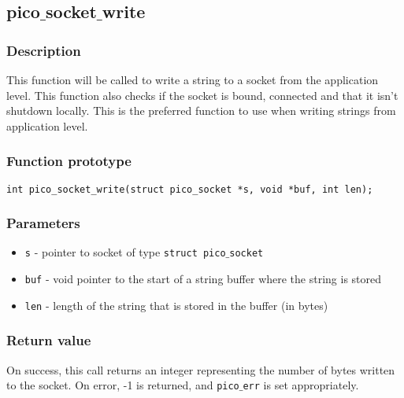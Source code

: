 \subsection{pico$\_$socket$\_$write}

\subsubsection*{Description}
This function will be called to write a string to a socket from the application level.
This function also checks if the socket is bound, connected and that it isn't shutdown
locally. This is the preferred function to use when writing strings from application
level. 

\subsubsection*{Function prototype}
\begin{verbatim}
int pico_socket_write(struct pico_socket *s, void *buf, int len);
\end{verbatim}

\subsubsection*{Parameters}
\begin{itemize}[noitemsep]
\item \texttt{s} - pointer to socket of type \texttt{struct pico$\_$socket}
\item \texttt{buf} - void pointer to the start of a string buffer where the string is stored
\item \texttt{len} - length of the string that is stored in the buffer (in bytes)
\end{itemize}

\subsubsection*{Return value}
On success, this call returns an integer representing the number of bytes written to the socket.
On error, -1 is returned, and \texttt{pico$\_$err} is set appropriately.


